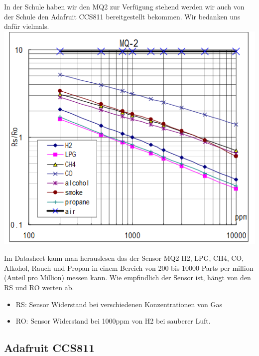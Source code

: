 In der Schule haben wir den MQ2 zur Verfügung stehend werden wir auch von der Schule den Adafruit CCS811 bereitgestellt bekommen. Wir bedanken uns dafür vielmals.
\newline
{\includegraphics[width=0.8\linewidth]{figures/DatasheetMQ2.png}}{\cite{MQ_Datasheet}}

\cite{MQ_Sensoren}
\newline 

Im Datasheet \cite{MQ_Datasheet} kann man herauslesen das der Sensor MQ2 \cite{MQ_Sensoren} H2, LPG, CH4, CO, Alkohol, Rauch und Propan in einem Bereich von 200 bis 10000 Parts per million (Anteil pro Million) messen kann. Wie empfindlich der Sensor ist, hängt von den RS und RO werten ab.

\begin{itemize}
	\item RS: Sensor Widerstand bei verschiedenen Konzentrationen von Gas
	\item RO: Sensor Widerstand bei 1000ppm von H2 bei sauberer Luft.
\end{itemize}

\subsection{Adafruit CCS811}

